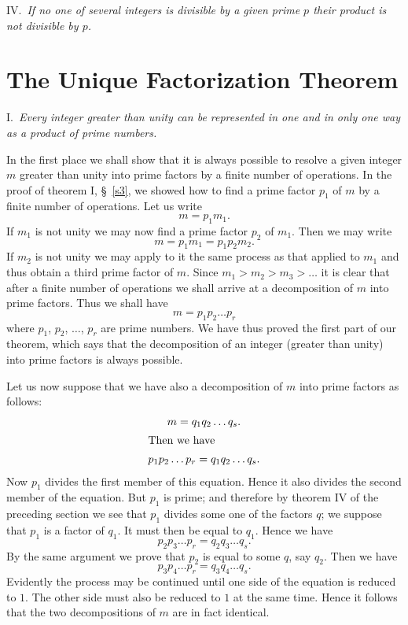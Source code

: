 \documentclass[oneside]{book}
\begin{document}
\smallskip IV.~\emph{If no one of several integers is divisible by a
given prime $p$ their product is not divisible by $p$.}

\section{The Unique Factorization Theorem}\label{s7}%

I.~\emph{Every integer greater than unity can be represented in one
and in only one way as a product of prime numbers.}

In the first place we shall show that it is always possible to
resolve a given integer $m$ greater than unity into prime factors by
a finite number of operations. In the proof of theorem I,
\S~\ref{s3}, we showed how to find a prime factor $p_1$ of $m$ by a
finite number of operations. Let us write
\begin{equation*}
m = p_1 m_1.
\end{equation*}
If $m_1$ is not unity we may now find a prime factor $p_2$ of $m_1$.
Then we may write
\begin{equation*}
m = p_1 m_1 = p_1 p_2 m_2.
\end{equation*}
If $m_2$ is not unity we may apply to it the same process as that
applied to $m_1$ and thus obtain a third prime factor of $m$. Since
$m_1 > m_2 > m_3 > \ldots$ it is clear that after a finite number of
operations we shall arrive at a decomposition of $m$ into prime
factors. Thus we shall have
\begin{equation*}
m = p_1 p_2 \ldots p_r
\end{equation*}
where $p_1$, $p_2$, $\ldots$, $p_r$ are prime numbers. We have thus
proved the first part of our theorem, which says that the
decomposition of an integer (greater than unity) into prime factors
is always possible.

Let us now suppose that we have also a decomposition of $m$ into
prime factors as follows:
\begin{gather*}
m = q_1 q_2 \ldots q_s. \\
\intertext{Then we have}
p_1 p_2 \ldots p_r = q_1 q_2 \ldots q_s.
\end{gather*}
Now $p_1$ divides the first member of this equation. Hence it also
divides the second member of the equation. But $p_1$ is prime; and
therefore by theorem IV of the preceding section we see that $p_1$
divides some one of the factors $q$; we suppose that $p_1$ is a
factor of $q_1$. It must then be equal to $q_1$. Hence we have
\begin{equation*}
p_2 p_3 \ldots p_r = q_2 q_3 \ldots q_s.
\end{equation*}
By the same argument we prove that $p_2$ is equal to some $q$, say
$q_2$. Then we have
\begin{equation*}
p_3 p_4 \ldots p_r = q_3 q_4 \ldots q_s.
\end{equation*}
Evidently the process may be continued until one side of the
equation is reduced to $1$. The other side must also be reduced to
$1$ at the same time. Hence it follows that the two decompositions
of $m$ are in fact identical.
\end{document}
